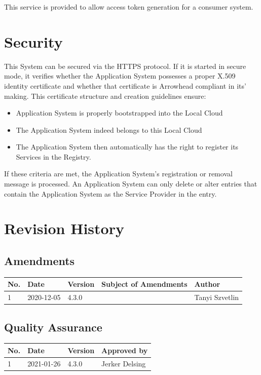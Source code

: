 \documentclass[a4paper]{arrowhead}
\begin{document}
This service is provided to allow access token generation for a consumer system.

\section{Security}
\label{sec:security}

This System can be secured via the HTTPS protocol. If it is started in secure mode, it verifies whether the Application System possesses a proper X.509 identity certificate and whether that certificate is Arrowhead compliant in its' making. This certificate structure and creation guidelines ensure:

\begin{itemize}
    \item Application System is properly bootstrapped into the Local Cloud
    \item The Application System indeed belongs to this Local Cloud
    \item The Application System then automatically has the right to register its Services in the Registry.
   
\end{itemize}

 If these criteria are met, the Application System’s registration or removal message is processed. An Application System can only delete or alter entries that contain the Application System as the Service Provider in the entry.

\newpage




\newpage

\section{Revision History}
\subsection{Amendments}

\noindent\begin{tabularx}{\textwidth}{| p{1cm} | p{3cm} | p{2cm} | X | p{4cm} |} \hline
\rowcolor{gray!33} No. & Date & Version & Subject of Amendments & Author \\ \hline

1 & 2020-12-05 & 4.3.0 &  & Tanyi Szvetlin \\ \hline


\end{tabularx}

\subsection{Quality Assurance}

\noindent\begin{tabularx}{\textwidth}{| p{1cm} | p{3cm} | p{2cm} | X |} \hline
\rowcolor{gray!33} No. & Date & Version & Approved by \\ \hline

1 & 2021-01-26 & 4.3.0 & Jerker Delsing \\ \hline

\end{tabularx}
\end{document}
